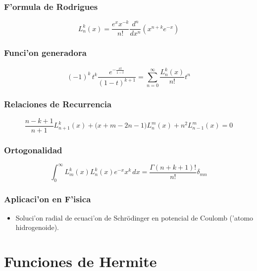 \subsubsection{F'ormula de Rodrigues}

\begin{equation}
L_{n}^{k}(x)=\frac{e^{x}x^{-k}}{n!}\frac{d^{n}}{dx^{n}}(x^{n+k}e^{-x})
\end{equation}

\subsubsection{Funci'on generadora}

\begin{equation}
(-1)^{k}\, t^{k} \frac{e^{-\frac{xt}{1-t}}}{(1-t)^{k+1}}=\sum_{n=0}^{\infty}\frac{L^{k}_{n}(x)}{n!}t^{n}
\end{equation}

\subsubsection{Relaciones de Recurrencia}

\begin{equation}
\frac{n-k+1}{n+1} L_{n+1}^{k}(x) + \Big(x+m-2n-1\Big) L_n^m(x) + n^2 L^m_{n-1}(x) = 0
\end{equation}


\subsubsection{Ortogonalidad}

\begin{equation}
\int_{0}^{\infty}L^k_{m}(x)L^k_{n}(x)e^{-x}x^{k}\,dx=\frac{\Gamma(n+k+1)!}{n!}\delta_{mn}
\end{equation}

\subsubsection{Aplicaci'on en F'isica}
\begin{itemize}
\item Soluci'on radial de ecuaci'on de Schr\"odinger en potencial de Coulomb ('atomo hidrogenoide).
\end{itemize}


\newpage
\section{Funciones de Hermite}

